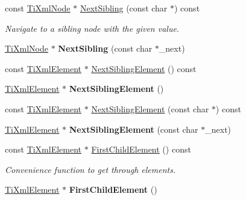 \begin{DoxyCompactItemize}
\item 
const \hyperlink{classTiXmlNode}{Ti\+Xml\+Node} $\ast$ \hyperlink{classTiXmlNode_acaf9dc17531ac041f602f9ad579573ea}{Next\+Sibling} (const char $\ast$) const \hypertarget{classTiXmlNode_acaf9dc17531ac041f602f9ad579573ea}{}\label{classTiXmlNode_acaf9dc17531ac041f602f9ad579573ea}

\begin{DoxyCompactList}\small\item\em Navigate to a sibling node with the given \textquotesingle{}value\textquotesingle{}. \end{DoxyCompactList}\item 
\hyperlink{classTiXmlNode}{Ti\+Xml\+Node} $\ast$ {\bfseries Next\+Sibling} (const char $\ast$\+\_\+next)\hypertarget{classTiXmlNode_a4080bc5cc8a5c139e7cf308669e850fc}{}\label{classTiXmlNode_a4080bc5cc8a5c139e7cf308669e850fc}

\item 
const \hyperlink{classTiXmlElement}{Ti\+Xml\+Element} $\ast$ \hyperlink{classTiXmlNode_a7667217e269e0da01d1f82aee94d1a3d}{Next\+Sibling\+Element} () const 
\item 
\hyperlink{classTiXmlElement}{Ti\+Xml\+Element} $\ast$ {\bfseries Next\+Sibling\+Element} ()\hypertarget{classTiXmlNode_a1b211cb5034655a04358e0e2f6fc5010}{}\label{classTiXmlNode_a1b211cb5034655a04358e0e2f6fc5010}

\item 
const \hyperlink{classTiXmlElement}{Ti\+Xml\+Element} $\ast$ \hyperlink{classTiXmlNode_a3d7897999f99cf4870dd59df6331d7ff}{Next\+Sibling\+Element} (const char $\ast$) const 
\item 
\hyperlink{classTiXmlElement}{Ti\+Xml\+Element} $\ast$ {\bfseries Next\+Sibling\+Element} (const char $\ast$\+\_\+next)\hypertarget{classTiXmlNode_a6e1ac6b800e18049bc75e9f8e63a8e5f}{}\label{classTiXmlNode_a6e1ac6b800e18049bc75e9f8e63a8e5f}

\item 
const \hyperlink{classTiXmlElement}{Ti\+Xml\+Element} $\ast$ \hyperlink{classTiXmlNode_ab1f8d8e70d88aea4c5efedfe00862d55}{First\+Child\+Element} () const \hypertarget{classTiXmlNode_ab1f8d8e70d88aea4c5efedfe00862d55}{}\label{classTiXmlNode_ab1f8d8e70d88aea4c5efedfe00862d55}

\begin{DoxyCompactList}\small\item\em Convenience function to get through elements. \end{DoxyCompactList}\item 
\hyperlink{classTiXmlElement}{Ti\+Xml\+Element} $\ast$ {\bfseries First\+Child\+Element} ()\hypertarget{classTiXmlNode_aa0fecff1f3866ab33a8a25506e95db1d}{}\label{classTiXmlNode_aa0fecff1f3866ab33a8a25506e95db1d}


\end{DoxyCompactItemize}
